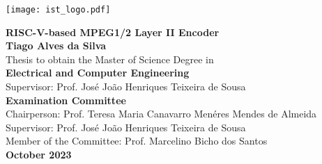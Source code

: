 \documentclass[10pt]{esda}
\title{}
\author{}
\date{}
\begin{document}
\texttt{[image: ist\_logo.pdf]}

\thispagestyle{empty}

\begin{onehalfspace}

\begin{center}
\begin{Large}
  \vspace{5cm}
  {\bf \Large {RISC-V-based MPEG1/2 Layer II Encoder}}\\
  \vspace{2.5cm}
  {\bf \large Tiago Alves da Silva}\\
  \vspace{2cm}
  \normalsize {Thesis to obtain the Master of Science Degree in}\\
  \vspace{0.5cm}
  {\bf \Large {Electrical and Computer Engineering}}\\
  \vspace{2cm}
  \normalsize {Supervisor: Prof. José João Henriques Teixeira de Sousa}\\
  \vspace{1.5cm}
  {\bf \large Examination Committee}\\
  \vspace{1cm}
  \normalsize {Chairperson: Prof. Teresa Maria Canavarro Menéres Mendes de Almeida}\\
  \normalsize {Supervisor: Prof. José João Henriques Teixeira de Sousa}\\
  \normalsize {Member of the Committee: Prof. Marcelino Bicho dos Santos}\\

  \vspace{2cm}
  {\bf \large October 2023 }
\end{Large}
\end{center}

\end{onehalfspace}


\cleardoublepage
\end{document}
